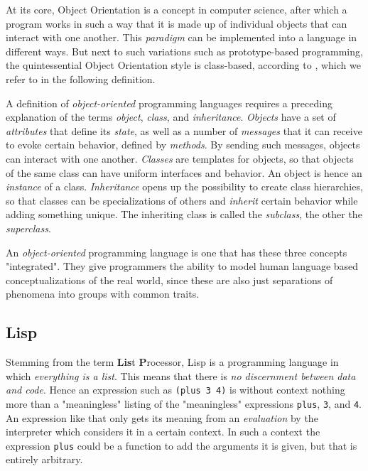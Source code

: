 \documentclass[oribibl]{llncs}
\begin{document}
At its core, Object Orientation is a concept in computer science, after which a program works in such a way that it is made up of individual objects that can interact with one another. This \emph{paradigm} can be implemented into a language in different ways. But next to such variations such as prototype-based programming, the quintessential Object Orientation style is class-based, according to \cite{wegner1987dimensions}, which we refer to in the following  definition.

A definition of \emph{object-oriented} programming languages requires a preceding explanation of the terms \emph{object}, \emph{class}, and \emph{inheritance}. \emph{Objects} have a set of \emph{attributes} that define its \emph{state}, as well as a number of \emph{messages} that it can receive to evoke certain behavior, defined by \emph{methods}. By sending such messages, objects can interact with one another. \emph{Classes} are templates for objects, so that objects of the same class can have uniform interfaces and behavior. An object is hence an \emph{instance} of a class. \emph{Inheritance} opens up the possibility to create class hierarchies, so that classes can be specializations of others and \emph{inherit} certain behavior while adding something unique. The inheriting class is called the \emph{subclass}, the other the \emph{superclass}. \cite{wegner1987dimensions}

An \emph{object-oriented} programming language is one that has these three concepts "integrated". They give programmers the ability to model human language based conceptualizations of the real world, since these are also just separations of phenomena into groups with common traits.

\subsection{Lisp}
\label{sec:lisp}

Stemming from the term \textbf{Lis}t \textbf{P}rocessor, Lisp is a programming language in which \emph{everything is a list}. This means that there is \emph{no discernment between data and code}. Hence an expression such as \texttt{(plus 3 4)} is without context nothing more than a "meaningless" listing of the "meaningless" expressions \texttt{plus}, \texttt{3}, and \texttt{4}. An expression like that only gets its meaning from an \emph{evaluation} by the interpreter which considers it in a certain context. In such a context the expression \texttt{plus} could be a function to add the arguments it is given, but that is entirely arbitrary. 
\end{document}
